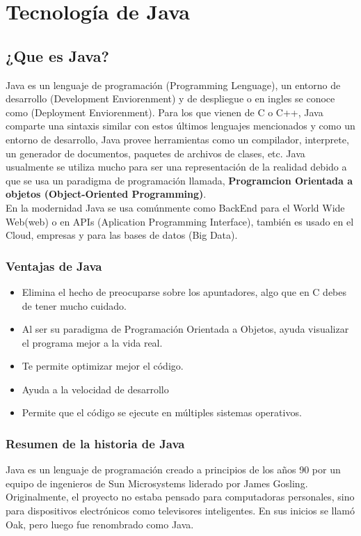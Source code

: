 

\chapter{Tecnología de Java}


\minitoc 
\newpage 

\section{¿Que es Java?}

Java es un lenguaje de programación (Programming Lenguage), un entorno de desarrollo (Development Enviorenment) y de despliegue o en ingles se conoce como (Deployment Enviorenment).
Para los que vienen de C o C++, Java comparte una sintaxis similar con estos últimos lenguajes mencionados y como un entorno de desarrollo, Java provee herramientas como un compilador, interprete, un generador de documentos, paquetes de archivos de clases, etc.
Java usualmente se utiliza mucho para ser una representación de la realidad debido a que se usa un paradigma de programación llamada, \textbf{Programcion Orientada a objetos (Object-Oriented Programming)}.\\
En la modernidad Java se usa comúnmente como BackEnd para el World Wide Web(web) o en APIs (Aplication Programming Interface), también es usado en el Cloud, empresas y para las bases de datos (Big Data).
\subsection{Ventajas de Java}
\begin{itemize}
	\item Elimina el hecho de preocuparse sobre los apuntadores, algo que en C debes de tener mucho cuidado.
	\item Al ser su paradigma de Programación Orientada a Objetos, ayuda visualizar el programa mejor a la vida real. 
	\item Te permite optimizar mejor el código.
	\item Ayuda a la velocidad de desarrollo 
	\item Permite que el código se ejecute en múltiples sistemas operativos.
\end{itemize}
\subsection{Resumen de la historia de Java}

Java es un lenguaje de programación creado a principios de los años 90 por un equipo de ingenieros de Sun Microsystems liderado por James Gosling. Originalmente, el proyecto no estaba pensado para computadoras personales, sino para dispositivos electrónicos como televisores inteligentes. En sus inicios se llamó Oak, pero luego fue renombrado como Java.

